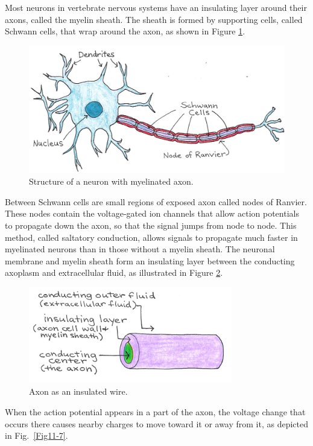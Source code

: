 Most neurons in vertebrate nervous systems have an insulating layer around their axons, called the myelin sheath.  The sheath is formed by supporting cells, called Schwann cells, that wrap around the axon, as shown in Figure \ref{Fig11-5}. 
\begin{figure}[!htb]
	\centering
	\includegraphics[width=4.5in]{./figures/Topic11/Fig11-5.jpg}
	\caption{Structure of a neuron with myelinated axon.}
	\label{Fig11-5}
\end{figure}
Between Schwann cells are small regions of exposed axon called nodes of Ranvier.  These nodes contain the voltage-gated ion channels that allow action potentials to propagate down the axon, so that the signal jumps from node to node.  This method, called saltatory conduction, allows signals to propagate much faster in myelinated neurons than in those without a myelin sheath.  The neuronal membrane and myelin sheath form an insulating layer between the conducting axoplasm and extracellular fluid, as illustrated in Figure \ref{Fig11-6}.
\begin{figure}[!htb]
	\centering
	\includegraphics[width=3.5in]{./figures/Topic11/Fig11-6.jpg}
	\caption{Axon as an insulated wire.}
	\label{Fig11-6}
\end{figure}
When the action potential appears in a part of the axon, the voltage change that occurs there causes nearby charges to move toward it or away from it, as depicted in Fig.~\ref{Fig11-7}. 
